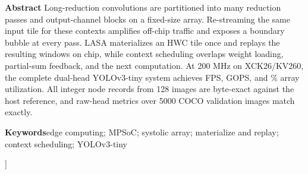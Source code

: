 \documentclass[10.5pt,compsoc,UTF8]{CjC}
\begin{document}
\begin{minipage}{\textwidth}
\vspace{1mm}
\noindent\textbf{Abstract}\quad
Long-reduction convolutions are partitioned into many reduction passes and
output-channel blocks on a fixed-size array.  Re-streaming the same input tile
for these contexts amplifies off-chip traffic and exposes a boundary bubble at
every pass.  LASA materializes an HWC tile once and replays the resulting
windows on chip, while context scheduling overlaps weight loading, partial-sum
feedback, and the next computation.  At 200 MHz on XCK26/KV260, the complete
dual-head YOLOv3-tiny system achieves \ResidentFPS{} FPS,
\PLEffectiveGOPS{} GOPS, and \ArrayUtilization{}\% array utilization.  All
\NodeRecords{} integer node records from 128 images are byte-exact against the
host reference, and raw-head metrics over 5000 COCO validation images match
exactly.\par

\vspace{2mm}
\noindent\textbf{Keywords}\quad edge computing; MPSoC; systolic array;
materialize and replay; context scheduling; YOLOv3-tiny\par
\vspace{2mm}
\end{minipage}
]
\flushend







\raggedbottom
\raggedend


\vspace{2mm}


\end{document}
